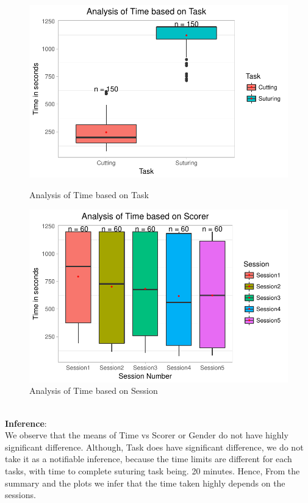 \documentclass[12pt,epsf]{report}
\begin{document}
{\begin{figure}[!htb]
\begin{minipage}[c]{0.5\linewidth}
	\includegraphics[width=\linewidth]{TaskVsTime.pdf}
	\caption{Analysis of Time based on Task}
	\end{minipage}
	\hfill
	\begin{minipage}[c]{0.5\linewidth}
	\includegraphics[width=\linewidth]{SessionVsTime.pdf}
	\caption{Analysis of Time based on Session}
	\end{minipage}
\end{figure}\\
\textbf{Inference}:\\
We observe that the means of Time vs Scorer or Gender do not have highly significant difference. Although, Task does have significant difference, we do not take it as a notifiable inference, because the time limits are different for each tasks, with time to complete suturing task being. 20 minutes. Hence, From the summary and the plots we infer that the time taken highly depends on the sessions.\\
\\
\FloatBarrier
}
\end{document}

